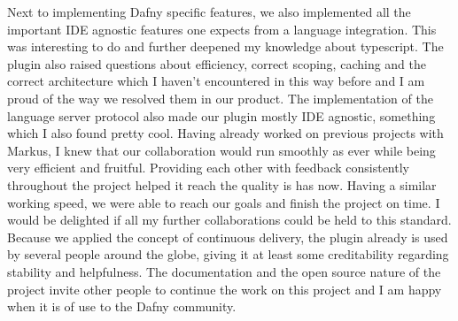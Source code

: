 Next to implementing Dafny specific features, we also implemented all the important IDE agnostic features one expects from a language integration. This was interesting to do and further deepened my knowledge about typescript. The plugin also raised questions about efficiency, correct scoping, caching and the correct architecture which I haven't encountered in this way before and I am proud of the way we resolved them in our product. The implementation of the language server protocol also made our plugin mostly IDE agnostic, something which I also found pretty cool. \newline 
Having already worked on previous projects with Markus, I knew that our collaboration would run smoothly as ever while being very efficient and fruitful. Providing each other with feedback consistently throughout the project helped it reach the quality is has now. Having a similar working speed, we were able to reach our goals and finish the project on time. I would be delighted if all my further collaborations could be held to this standard. \newline
Because we applied the concept of continuous delivery, the plugin already is used by several people around the globe, giving it at least some creditability regarding stability and helpfulness. The documentation and the open source nature of the project invite other people to continue the work on this project and I am happy when it is of use to the Dafny community. 
